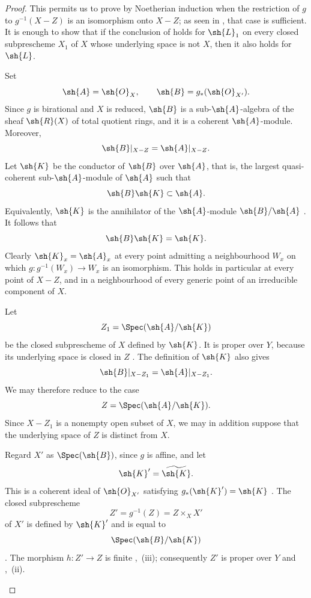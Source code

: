 \begin{proof}

This permits us to prove  by Noetherian induction
 when the restriction of $g$ to $g^{-1}(X-Z)$ is an
isomorphism onto $X-Z$; as seen in , that case is
sufficient.
It is enough to show that if the conclusion of  holds
for $\sh{L}_1$ on every closed subprescheme $X_1$ of $X$ whose
underlying space is not $X$, then it also holds for $\sh{L}$.

\begin{env}[2.6.2.4]
\label{III.2.6.2.4}
Set
\[
  \sh{A}=\sh{O}_X,
  \qquad
  \sh{B}=g_*(\sh{O}_{X'}).
\]
Since $g$ is birational and $X$ is reduced, $\sh{B}$ is a
sub-$\sh{A}$-algebra of the sheaf $\sh{R}(X)$ of total quotient rings,
and it is a coherent $\sh{A}$-module.
Moreover,
\[
  \sh{B}|_{X-Z}=\sh{A}|_{X-Z}.
\]
Let $\sh{K}$ be the conductor of $\sh{B}$ over $\sh{A}$, that is, the
largest quasi-coherent sub-$\sh{A}$-module of $\sh{A}$ such that
\[
  \sh{B}\sh{K}\subset\sh{A}.
\]
Equivalently, $\sh{K}$ is the annihilator of the
$\sh{A}$-module $\sh{B}/\sh{A}$ .
It follows that
\[
  \sh{B}\sh{K}=\sh{K}.
\]
Clearly $\sh{K}_x=\sh{A}_x$ at every point admitting a neighbourhood
$W_x$ on which $g:g^{-1}(W_x)\to W_x$ is an isomorphism.
This holds in particular at every point of $X-Z$, and in a
neighbourhood of every generic point of an irreducible component of
$X$.

Let
\[
  Z_1=\Spec(\sh{A}/\sh{K})
\]
be the closed subprescheme of $X$ defined by $\sh{K}$.
It is proper over $Y$, because its underlying space is closed in $Z$
.
The definition of $\sh{K}$ also gives
\[
  \sh{B}|_{X-Z_1}=\sh{A}|_{X-Z_1}.
\]
We may therefore reduce to the case
\[
  Z=\Spec(\sh{A}/\sh{K}).
\]
Since $X-Z_1$ is a nonempty open subset of $X$, we may in addition
suppose that the underlying space of $Z$ is distinct from $X$.
\end{env}

\begin{env}[2.6.2.5]
\label{III.2.6.2.5}
Regard $X'$ as $\Spec(\sh{B})$, since $g$ is affine, and let
\[
  \sh{K}'=\widetilde{\sh{K}}.
\]
This is a coherent ideal of $\sh{O}_{X'}$ satisfying
$g_*(\sh{K}')=\sh{K}$ .
The closed subprescheme
\[
  Z'=g^{-1}(Z)=Z\times_X X'
\]
of $X'$ is defined by $\sh{K}'$ and is equal to
\[
  \Spec(\sh{B}/\sh{K})
\]
.
The morphism $h:Z'\to Z$ is finite ,~(iii);
consequently $Z'$ is proper over $Y$  and
,~(ii).


\end{env}
\end{proof}
